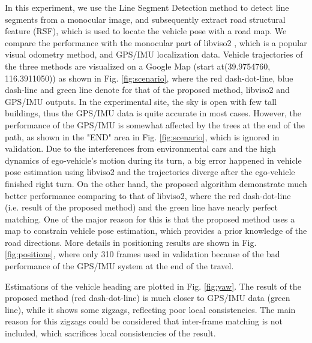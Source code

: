 \documentclass[letterpaper, 10 pt, conference]{ieeeconf}  %
\begin{document}
In this experiment, we use the Line Segment Detection method \cite{von2012lsd} to detect line segments from a monocular image, and subsequently extract road structural feature (RSF), which is used to locate the vehicle pose with a road map. We compare the performance with the monocular part of libviso2 \cite{Geiger11}\cite{Geiger2013Visual}, which is a popular visual odometry method, and GPS/IMU localization data. Vehicle trajectories of the three methods are visualized on a Google Map (start at(39.9754760, 116.3911050)) as shown in Fig. \ref{fig:scenario}, where the red dash-dot-line, blue dash-line and green line denote for that of the proposed method, libviso2 and GPS/IMU outputs. In the experimental site, the sky is open with few tall buildings, thus the GPS/IMU data is quite accurate in most cases. However, the performance of the GPS/IMU is somewhat affected by the trees at the end of the path, as shown in the "END" area in Fig. \ref{fig:scenario}, which is ignored in validation. Due to the interferences from environmental cars and the high dynamics of ego-vehicle's motion during its turn, a big error happened in vehicle pose estimation using libviso2 and the trajectories diverge after the ego-vehicle finished right turn. On the other hand, the proposed algorithm demonstrate much better performance comparing to that of libviso2, where the red dash-dot-line (i.e. result of the proposed method) and the green line have nearly perfect matching. One of the major reason for this is that the proposed method uses a map to constrain vehicle pose estimation, which provides a prior knowledge of the road directions. More details in positioning results are shown in Fig. \ref{fig:positions}, where only 310 frames used in validation because of the bad performance of the GPS/IMU system at the end of the travel.

Estimations of the vehicle heading are plotted in Fig. \ref{fig:yaw}. The result of the proposed method (red dash-dot-line) is much closer to GPS/IMU data (green line), while it shows some zigzags, reflecting poor local consistencies. The main reason for this zigzags could be considered that inter-frame matching is not included, which sacrifices local consistencies of the result.


\end{document}
